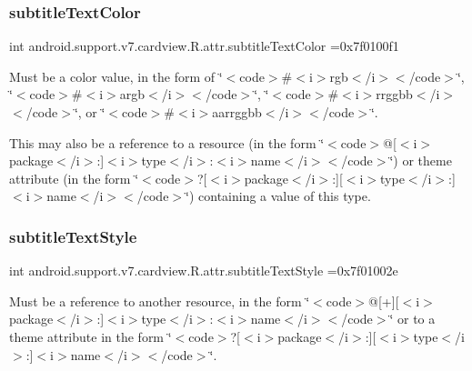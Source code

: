 \subsubsection{\texorpdfstring{subtitle\+Text\+Color}{subtitleTextColor}}
{\footnotesize\ttfamily int android.\+support.\+v7.\+cardview.\+R.\+attr.\+subtitle\+Text\+Color =0x7f0100f1\hspace{0.3cm}{\ttfamily [static]}}

Must be a color value, in the form of \char`\"{}$<$code$>$\#$<$i$>$rgb$<$/i$>$$<$/code$>$\char`\"{}, \char`\"{}$<$code$>$\#$<$i$>$argb$<$/i$>$$<$/code$>$\char`\"{}, \char`\"{}$<$code$>$\#$<$i$>$rrggbb$<$/i$>$$<$/code$>$\char`\"{}, or \char`\"{}$<$code$>$\#$<$i$>$aarrggbb$<$/i$>$$<$/code$>$\char`\"{}. 

This may also be a reference to a resource (in the form \char`\"{}$<$code$>$@\mbox{[}$<$i$>$package$<$/i$>$\+:\mbox{]}$<$i$>$type$<$/i$>$\+:$<$i$>$name$<$/i$>$$<$/code$>$\char`\"{}) or theme attribute (in the form \char`\"{}$<$code$>$?\mbox{[}$<$i$>$package$<$/i$>$\+:\mbox{]}\mbox{[}$<$i$>$type$<$/i$>$\+:\mbox{]}$<$i$>$name$<$/i$>$$<$/code$>$\char`\"{}) containing a value of this type. \mbox{\label{classandroid_1_1support_1_1v7_1_1cardview_1_1R_1_1attr_ab76882e8855338c32b6fe8ee7b986537}} 
\subsubsection{\texorpdfstring{subtitle\+Text\+Style}{subtitleTextStyle}}
{\footnotesize\ttfamily int android.\+support.\+v7.\+cardview.\+R.\+attr.\+subtitle\+Text\+Style =0x7f01002e\hspace{0.3cm}{\ttfamily [static]}}

Must be a reference to another resource, in the form \char`\"{}$<$code$>$@\mbox{[}+\mbox{]}\mbox{[}$<$i$>$package$<$/i$>$\+:\mbox{]}$<$i$>$type$<$/i$>$\+:$<$i$>$name$<$/i$>$$<$/code$>$\char`\"{} or to a theme attribute in the form \char`\"{}$<$code$>$?\mbox{[}$<$i$>$package$<$/i$>$\+:\mbox{]}\mbox{[}$<$i$>$type$<$/i$>$\+:\mbox{]}$<$i$>$name$<$/i$>$$<$/code$>$\char`\"{}. \mbox{\label{classandroid_1_1support_1_1v7_1_1cardview_1_1R_1_1attr_ac8f6b21ae8cc1f561a1b39681bf76d69}} 
